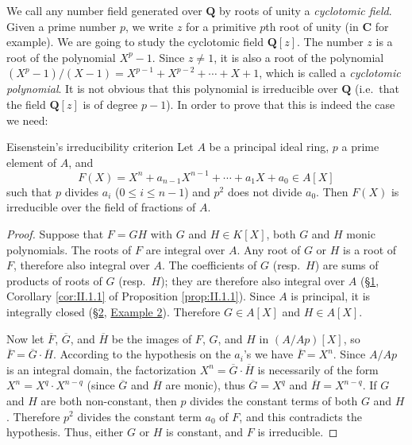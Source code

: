 
We call any number field generated over $\mathbf{Q}$ by roots of unity a
\emph{cyclotomic field}. Given a prime number $p$, we write $z$ for a
primitive $p$th root of unity (in $\mathbf{C}$ for example). We are going to
study the cyclotomic field $\mathbf{Q}[z]$. The number $z$ is a root of the
polynomial $X^{p}-1$. Since $z\neq1$, it is also a root of the polynomial
$(X^{p}-1)/(X-1)=X^{p-1}+X^{p-2}+\cdots+X+1$, which is called a
\emph{cyclotomic polynomial}. It is not obvious that this polynomial is
irreducible over $\mathbf{Q}$ (i.e.\ that the field $\mathbf{Q}[z]$ is of
degree $p-1$). In order to prove that this is indeed the case we need:

\begin{statement}{Eisenstein's irreducibility criterion}
Let $A$ be a principal ideal ring, $p$ a prime element of $A$, and
\[
F(X)=X^{n}+a_{n-1}X^{n-1}+\cdots+a_{1}X+a_{0}\in A[X]
\]
such that $p$ divides $a_{i}$ ($0\leq i\leq n-1$) and $p^{2}$ does not
divide $a_{0}$. Then $F(X)$ is irreducible over the field of fractions of
$A$.
\end{statement}

\begin{proof}
Suppose that $F=GH$ with $G$ and $H\in K[X]$, both $G$ and $H$ monic
polynomials. The roots of $F$ are integral over $A$. Any root of $G$ or $H$
is a root of $F$, therefore also integral over $A$. The coefficients of $G$
(resp.\ $H$) are sums of products of roots of $G$ (resp.\ $H$); they are
therefore also integral over $A$ (\hyperref[sec:2.1]{§1}, Corollary \ref{cor:II.1.1} of
Proposition \ref{prop:II.1.1}). Since $A$ is principal, it is integrally
closed (\hyperref[sec:2.2]{§2}, \hyperref[exa:II.2.2]{Example 2}). Therefore $G\in A[X]$ and $H\in A[X]$.

Now let $\overline{F}$, $\overline{G}$, and $\overline{H}$ be the images of
$F$, $G$, and $H$ in $(A/Ap)[X]$, so
$\overline{F}=\overline{G}\cdot\overline{H}$. According to the hypothesis on
the $a_{i}$'s we have $\overline{F}=X^{n}$. Since $A/Ap$ is an integral
domain, the factorization $X^{n}=\overline{G}\cdot\overline{H}$ is
necessarily of the form $X^{n}=X^{q}\cdot X^{n-q}$ (since
$\overline{G}$ and $\overline{H}$ are monic), thus
$\overline{G}=X^{q}$ and $\overline{H}=X^{n-q}$. If $G$ and $H$ are both
non-constant, then $p$ divides the constant terms of both $G$ and $H$.
Therefore $p^{2}$ divides the constant term $a_{0}$ of $F$, and this
contradicts the hypothesis. Thus, either $G$ or $H$ is constant, and $F$ is
irreducible.
\end{proof}

